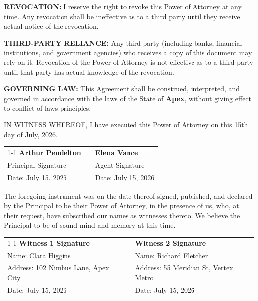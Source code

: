 \documentclass[10pt,letterpaper]{article}
\begin{document}
\begin{tcolorbox}[
    title={4. REVOCATION, RELIANCE \& GOVERNING LAW},
    before=\noindent,
    after=\vspace{8pt}
]
\textbf{REVOCATION:} I reserve the right to revoke this Power of Attorney at any time. Any revocation shall be ineffective as to a third party until they receive actual notice of the revocation.
\vspace{6pt}

\textbf{THIRD-PARTY RELIANCE:} Any third party (including banks, financial institutions, and government agencies) who receives a copy of this document may rely on it. Revocation of the Power of Attorney is not effective as to a third party until that party has actual knowledge of the revocation.
\vspace{6pt}

\textbf{GOVERNING LAW:} This Agreement shall be construed, interpreted, and governed in accordance with the laws of the State of \textbf{Apex}, without giving effect to conflict of laws principles.
\end{tcolorbox}

\begin{tcolorbox}[
    title={5. EXECUTION SIGNATURES},
    before=\noindent,
    after=\vspace{8pt}
]
IN WITNESS WHEREOF, I have executed this Power of Attorney on this 15th day of July, 2026.
\vspace{25pt}

\begin{tabularx}{\textwidth}{@{} X p{1.5cm} X @{}}
    \cline{1-1} \cline{3-3}
    \textbf{Arthur Pendelton} & & \textbf{Elena Vance} \\
    Principal Signature & & Agent Signature \\[10pt]{}
    Date: July 15, 2026 & & Date: July 15, 2026 \\
\end{tabularx}
\end{tcolorbox}

\begin{tcolorbox}[
    title={6. WITNESS STATEMENT},
    before=\noindent,
    after=\vspace{8pt}
]
\small
The foregoing instrument was on the date thereof signed, published, and declared by the Principal to be their Power of Attorney, in the presence of us, who, at their request, have subscribed our names as witnesses thereto. We believe the Principal to be of sound mind and memory at this time.
\vspace{20pt}

\begin{tabularx}{\textwidth}{@{} X p{1.5cm} X @{}}
    \cline{1-1} \cline{3-3}
    \textbf{Witness 1 Signature} & & \textbf{Witness 2 Signature} \\
    Name: Clara Higgins & & Name: Richard Fletcher \\
    Address: 102 Nimbus Lane, Apex City & & Address: 55 Meridian St, Vertex Metro \\
    Date: July 15, 2026 & & Date: July 15, 2026 \\
\end{tabularx}
\end{tcolorbox}
\end{document}
